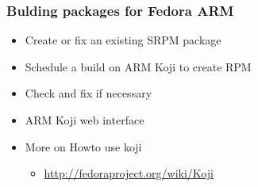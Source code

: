 \documentclass[11pt]{beamer}
\begin{document}
\begin{frame}[fragile]\frametitle{Bulding packages for Fedora ARM}
\label{sec-5.2}

\begin{itemize}

\item Create or fix an existing SRPM package\\
\label{sec-5.2.1}


\item Schedule a build on ARM Koji to create RPM\\
\label{sec-5.2.2}


\item Check and fix if necessary\\
\label{sec-5.2.3}


\item ARM Koji web interface\\
\label{sec-5.2.4}


\item More on Howto use koji\\
\label{sec-5.2.5}

\begin{itemize}

\item \href{http://fedoraproject.org/wiki/Koji}{http://fedoraproject.org/wiki/Koji}\\
\label{sec-5.2.5.1}


\end{itemize} %
\end{itemize} %
\end{frame}
\end{document}
